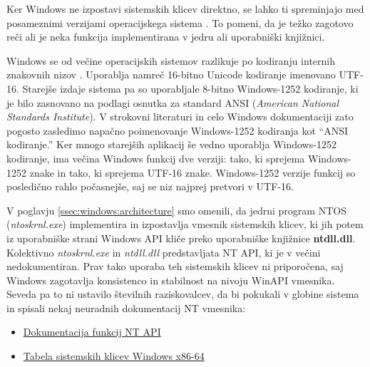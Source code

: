 \documentclass[a4paper,12pt,openright]{book}
\begin{document}
Ker Windows ne izpostavi sistemskih klicev direktno, se lahko ti spreminjajo med posameznimi verzijami operacijskega sistema \cite{Tanenbaum_Bos_2023}.
To pomeni, da je težko zagotovo reči ali je neka funkcija implementirana v jedru ali uporabniški knjižnici.

Windows se od večine operacijskih sistemov razlikuje po kodiranju internih znakovnih nizov \cite{Yosifovich_Russinovich_Solomon_Ionescu_2017}.
Uporablja namreč 16-bitno Unicode kodiranje imenovano UTF-16.
Starejše izdaje sistema pa so uporabljale 8-bitno Windows-1252 kodiranje, ki je bilo zasnovano na podlagi osnutka za standard ANSI (\textit{American National Standards Institute}).
V strokovni literaturi in celo Windows dokumentaciji zato pogosto zasledimo napačno poimenovanje Windows-1252 kodiranja kot ``ANSI kodiranje.''
Ker mnogo starejših aplikacij še vedno uporablja Windows-1252 kodiranje, ima večina Windows funkcij dve verziji: tako, ki sprejema Windows-1252 znake in tako, ki sprejema UTF-16 znake.
Windows-1252 verzije funkcij so posledično rahlo počasnejše, saj se niz najprej pretvori v UTF-16.

V poglavju \ref{ssec:windows:architecture} smo omenili, da jedrni program NTOS (\textit{ntoskrnl.exe}) implementira in izpostavlja vmesnik sistemskih klicev, ki jih potem iz uporabniške strani Windows API kliče preko uporabniške knjižnice \textbf{ntdll.dll}.
Kolektivno \textit{ntoskrnl.exe} in \textit{ntdll.dll} predstavljata NT API, ki je v večini nedokumentiran.
Prav tako uporaba teh sistemskih klicev ni priporočena, saj Windows zagotavlja konsistenco in stabilnost na nivoju WinAPI vmesnika.
Seveda pa to ni ustavilo številnih raziskovalcev, da bi pokukali v globine sistema in spisali nekaj neuradnih dokumentacij NT vmesnika:
\begin{itemize}
	\item \href{http://undocumented.ntinternals.net/}{Dokumentacija funkcij NT API}
	\item \href{https://j00ru.vexillium.org/syscalls/nt/64/}{Tabela sistemskih klicev Windows x86-64}
\end{itemize}
\end{document}
